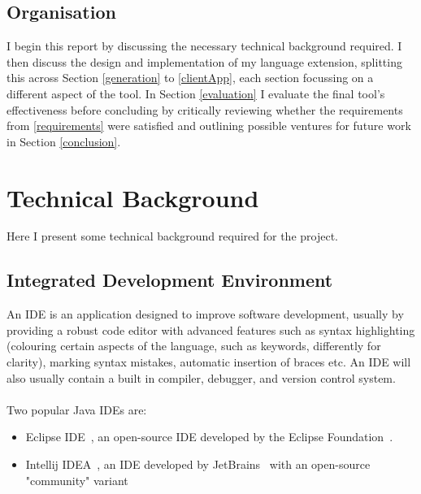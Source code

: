 \documentclass{article}
\begin{document}
\subsection{Organisation} 
I begin this report by discussing the necessary technical background required. I then discuss the design and implementation of my language extension, splitting this across Section \ref{generation} to \ref{clientApp}, each section focussing on a different aspect of the tool. In Section \ref{evaluation} I evaluate the final tool's effectiveness before concluding by critically reviewing whether the requirements from \ref{requirements} were satisfied and outlining possible ventures for future work in Section \ref{conclusion}. 

\section{Technical Background}
Here I present some technical background required for the project.
\subsection{Integrated Development Environment}
An IDE is an application designed to improve software development, usually by providing a robust code editor with advanced features such as syntax highlighting (colouring certain aspects of the language, such as keywords, differently for clarity), marking syntax mistakes, automatic insertion of braces etc. An IDE will also usually contain a built in compiler, debugger, and version control system. 
\\
\\
Two popular Java IDEs are:
\begin{itemize}
\item Eclipse IDE~\cite{eclipse}, an open-source IDE developed by the Eclipse Foundation~\cite{eclipseFoundation}.
\item Intellij IDEA~\cite{intellij}, an IDE developed by JetBrains~\cite{jetbrains} with an open-source "community" variant
\end{itemize}
%
\end{document}
